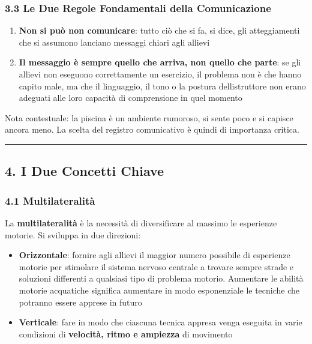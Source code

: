 \documentclass[a4paper,11pt]{article}
\providecommand{\tightlist}{%
  \setlength{\itemsep}{0pt}\setlength{\parskip}{0pt}}
\begin{document}
\subsubsection{3.3 Le Due Regole Fondamentali della
      Comunicazione}\label{le-due-regole-fondamentali-della-comunicazione}

\begin{enumerate}
      \tightlist
      \item
            \textbf{Non si può non comunicare}: tutto ciò che si fa, si dice, gli
            atteggiamenti che si assumono lanciano messaggi chiari agli allievi
      \item
            \textbf{Il messaggio è sempre quello che arriva, non quello che
                  parte}: se gli allievi non eseguono correttamente un esercizio, il
            problema non è che hanno capito male, ma che il linguaggio, il tono o
            la postura dell\textquotesingle istruttore non erano adeguati alle
            loro capacità di comprensione in quel momento
\end{enumerate}

Nota contestuale: la piscina è un ambiente rumoroso, si sente poco e si
capisce ancora meno. La scelta del registro comunicativo è quindi di
importanza critica.

\begin{center}\rule{0.5\linewidth}{0.5pt}\end{center}

\subsection{4. I Due Concetti Chiave}\label{i-due-concetti-chiave}

\subsubsection{4.1 Multilateralità}\label{multilateralituxe0}

La \textbf{multilateralità} è la necessità di diversificare al massimo
le esperienze motorie. Si sviluppa in due direzioni:

\begin{itemize}
      \tightlist
      \item
            \textbf{Orizzontale}: fornire agli allievi il maggior numero possibile
            di esperienze motorie per stimolare il sistema nervoso centrale a
            trovare sempre strade e soluzioni differenti a qualsiasi tipo di
            problema motorio. Aumentare le abilità motorie acquatiche significa
            aumentare in modo esponenziale le tecniche che potranno essere apprese
            in futuro
      \item
            \textbf{Verticale}: fare in modo che ciascuna tecnica appresa venga
            eseguita in varie condizioni di \textbf{velocità, ritmo e ampiezza} di
            movimento
\end{itemize}
\end{document}
